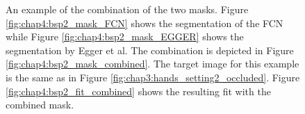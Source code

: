 \begin{figure}
\centering
{}
\caption{An example of the combination of the two masks. Figure \ref{fig:chap4:bsp2_mask_FCN} shows the segmentation of the FCN while Figure \ref{fig:chap4:bsp2_mask_EGGER} shows the segmentation by Egger et al. The combination is depicted in Figure \ref{fig:chap4:bsp2_mask_combined}. The target image for this example is the same as in Figure \ref{fig:chap3:hands_setting2_occluded}. Figure \ref{fig:chap4:bsp2_fit_combined} shows the resulting fit with the combined mask.}
\label{fig:chap4:bsp2}
\end{figure}



